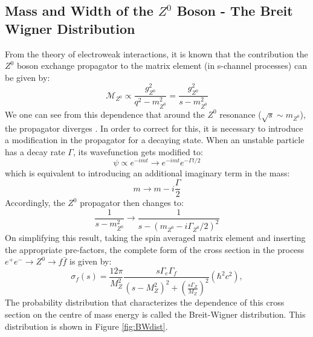 \subsection{Mass and Width of the $Z^{0}$ Boson - The Breit Wigner Distribution}
From the theory of electroweak interactions, it is known that the contribution the $Z^{0}$ boson exchange propagator to the matrix element (in s-channel processes) can be given by:
\begin{equation}
\mathcal{M}_{Z^{0}}\propto \dfrac{g_{Z^{0}}^{2}}{q^{2}-m_{Z^{0}}^{2}}=\dfrac{g_{Z^{0}}^{2}}{s-m_{Z^{0}}^{2}}
\end{equation}
We one can see from this dependence that around the $Z^{0}$ resonance ($\sqrt{s}\sim  m_{Z^{0}}$), the propagator diverges \cite{thomson_2013}. In order to correct for this, it is necessary to introduce a modification in the propagator for a decaying state. When an unstable particle has a decay rate $\Gamma$, its wavefunction gets modified to:
\begin{equation}
\psi\propto e^{-imt}\rightarrow e^{-imt}e^{-\Gamma t/2}
\end{equation} 
which is equivalent to introducing an additional imaginary term in the mass:
\begin{equation}
m\rightarrow m-i\dfrac{\Gamma}{2}
\end{equation}
Accordingly, the $Z^{0}$ propagator then changes to:
\begin{equation}
\dfrac{1}{s-m_{Z^{0}}^{2}}\rightarrow \dfrac{1}{s-{\left(m_{Z^{0}}-i\Gamma_{Z^{0}}/2\right)}^{2}} 
\end{equation}
On simplifying this result, taking the spin averaged matrix element and inserting the appropriate pre-factors, the complete form of the cross section in the process $e^{+}e^{-}\rightarrow Z^{0}\rightarrow f\bar{f}$ is given by:
\begin{equation}
    \sigma_f (s) = \frac{12\pi}{M_Z^2} \frac{s \Gamma_e \Gamma_f}{(s-M_Z^2)^2 + \left(\frac{s\Gamma_Z}{M_Z}\right)^2} (\hbar^2 c^2),
\end{equation} 
The probability distribution that characterizes the dependence of this cross section on the centre of mass energy is called the Breit-Wigner distribution. This distribution is shown in Figure \ref{fig:BWdist}.

